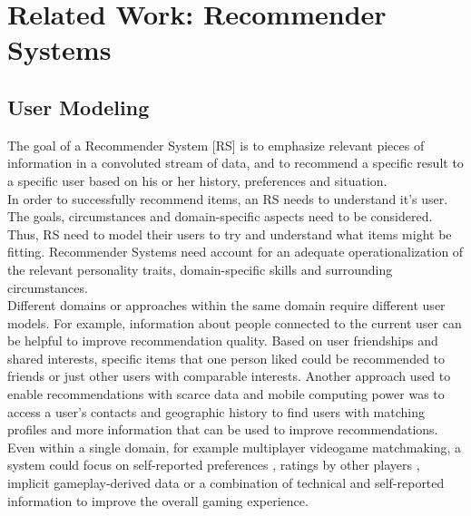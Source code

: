 \documentclass[nochapterpage,bigchapter,linedtoc,longdoc,colorback,accentcolor=tud3b,oneside]{tudreport}
\begin{document}
\renewcommand{\cleardoublepage}{}
\renewcommand{\clearpage}{}


\chapter{Related Work: Recommender Systems}

\section{User Modeling} \label{rw:usermodeling}
The goal of a Recommender System [RS] is to emphasize relevant pieces of information in a convoluted stream of data, and to recommend a specific result to a specific user based on his or her history, preferences and situation. \cite{ricci2011introduction}\\
In order to successfully recommend items, an RS needs to understand it's user. The goals, circumstances and domain-specific aspects need to be considered. Thus, RS need to model their users to try and understand what items might be fitting. Recommender Systems need account for an adequate operationalization of the relevant personality traits, domain-specific skills and surrounding circumstances.\\
Different domains or approaches within the same domain require different user models. For example, information about people connected to the current user can be helpful to improve recommendation quality. Based on user friendships and shared interests, specific items that one person liked could be recommended to friends \cite{feng2013recommendation} or just other users with comparable interests. \cite{hsu2018general} Another approach used to enable recommendations with scarce data and mobile computing power was to access a user's contacts and geographic history to find users with matching profiles and more information that can be used to improve recommendations. \cite{ramaswamy2009caesar}\\ 
Even within a single domain, for example multiplayer videogame matchmaking, a system could focus on self-reported preferences \cite{riegelsberger2007personality}, ratings by other players \cite{patrick2011system}, implicit gameplay-derived data \cite{suznjevic2015application, delalleau2012beyond} or a combination of technical and self-reported information to improve the overall gaming experience. \cite{farnham2009method}\\
\end{document}

